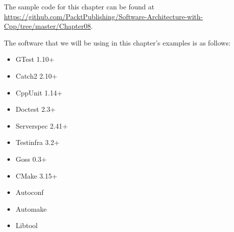The sample code for this chapter can be found at \url{https://github.com/PacktPublishing/Software-Architecture-with-Cpp/tree/master/Chapter08}.

The software that we will be using in this chapter's examples is as follows:

\begin{itemize}
\item 
GTest 1.10+

\item 
Catch2 2.10+

\item 
CppUnit 1.14+

\item 
Doctest 2.3+

\item 
Serverspec 2.41+

\item 
Testinfra 3.2+

\item 
Goss 0.3+

\item 
CMake 3.15+

\item 
Autoconf

\item 
Automake

\item 
Libtool
\end{itemize}